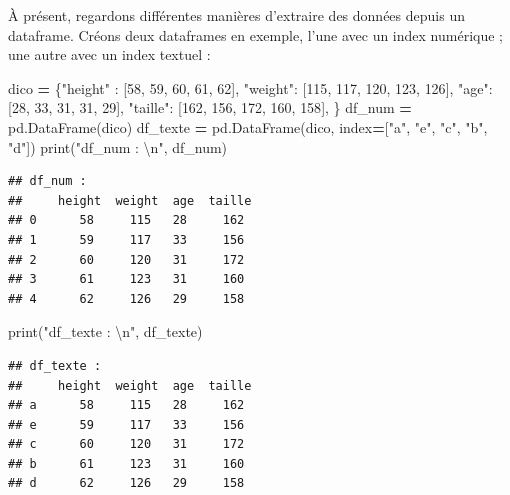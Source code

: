 \documentclass[
  12pt,
]{book}
\newenvironment{Shaded}{\begin{snugshade}}{\end{snugshade}}
\newcommand{\BuiltInTok}[1]{#1}
\newcommand{\CharTok}[1]{\textcolor[rgb]{0.31,0.60,0.02}{#1}}
\newcommand{\DecValTok}[1]{\textcolor[rgb]{0.00,0.00,0.81}{#1}}
\newcommand{\NormalTok}[1]{#1}
\newcommand{\OperatorTok}[1]{\textcolor[rgb]{0.81,0.36,0.00}{\textbf{#1}}}
\newcommand{\StringTok}[1]{\textcolor[rgb]{0.31,0.60,0.02}{#1}}
\numberwithin{equation}{section}
\numberwithin{countremarque}{section}
\begin{document}
À présent, regardons différentes manières d'extraire des données depuis un dataframe. Créons deux dataframes en exemple, l'une avec un index numérique ; une autre avec un index textuel :

\begin{Shaded}
\begin{Highlighting}[]
\NormalTok{dico }\OperatorTok{=}\NormalTok{ \{}\StringTok{"height"}\NormalTok{ : [}\DecValTok{58}\NormalTok{, }\DecValTok{59}\NormalTok{, }\DecValTok{60}\NormalTok{, }\DecValTok{61}\NormalTok{, }\DecValTok{62}\NormalTok{],}
        \StringTok{"weight"}\NormalTok{: [}\DecValTok{115}\NormalTok{, }\DecValTok{117}\NormalTok{, }\DecValTok{120}\NormalTok{, }\DecValTok{123}\NormalTok{, }\DecValTok{126}\NormalTok{],}
        \StringTok{"age"}\NormalTok{: [}\DecValTok{28}\NormalTok{, }\DecValTok{33}\NormalTok{, }\DecValTok{31}\NormalTok{, }\DecValTok{31}\NormalTok{, }\DecValTok{29}\NormalTok{],}
        \StringTok{"taille"}\NormalTok{: [}\DecValTok{162}\NormalTok{, }\DecValTok{156}\NormalTok{, }\DecValTok{172}\NormalTok{, }\DecValTok{160}\NormalTok{, }\DecValTok{158}\NormalTok{],}
\NormalTok{       \} }
\NormalTok{df\_num }\OperatorTok{=}\NormalTok{ pd.DataFrame(dico)}
\NormalTok{df\_texte }\OperatorTok{=}\NormalTok{ pd.DataFrame(dico, index}\OperatorTok{=}\NormalTok{[}\StringTok{"a"}\NormalTok{, }\StringTok{"e"}\NormalTok{, }\StringTok{"c"}\NormalTok{, }\StringTok{"b"}\NormalTok{, }\StringTok{"d"}\NormalTok{])}
\BuiltInTok{print}\NormalTok{(}\StringTok{"df\_num : }\CharTok{\textbackslash{}n}\StringTok{"}\NormalTok{, df\_num)}
\end{Highlighting}
\end{Shaded}

\begin{lstlisting}
## df_num : 
##     height  weight  age  taille
## 0      58     115   28     162
## 1      59     117   33     156
## 2      60     120   31     172
## 3      61     123   31     160
## 4      62     126   29     158
\end{lstlisting}

\begin{Shaded}
\begin{Highlighting}[]
\BuiltInTok{print}\NormalTok{(}\StringTok{"df\_texte : }\CharTok{\textbackslash{}n}\StringTok{"}\NormalTok{, df\_texte)}
\end{Highlighting}
\end{Shaded}

\begin{lstlisting}
## df_texte : 
##     height  weight  age  taille
## a      58     115   28     162
## e      59     117   33     156
## c      60     120   31     172
## b      61     123   31     160
## d      62     126   29     158
\end{lstlisting}
\end{document}
